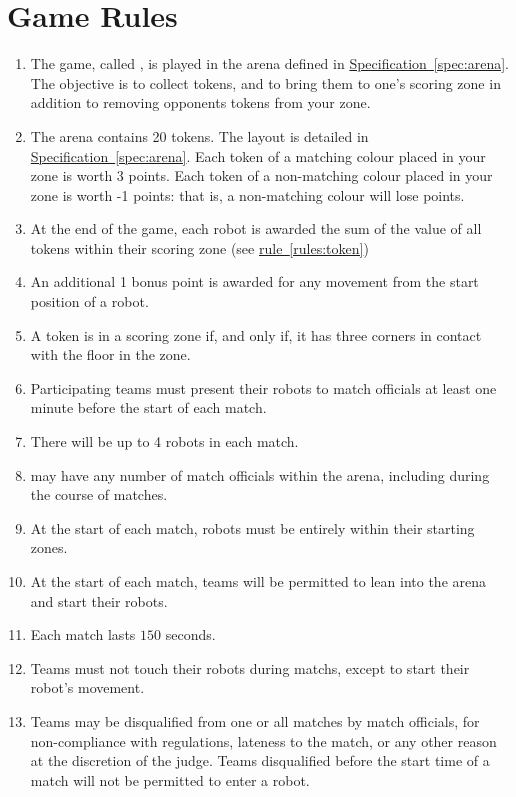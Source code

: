 \section{Game Rules}
\label{sec:rules}

\begin{enumerate}
  \item The game, called \emph{\gamename}, is played in the arena defined in
        \hyperref[spec:arena]{Specification~\ref*{spec:arena}}. The objective is
        to collect tokens, and to bring them to one's scoring zone in addition
        to removing opponents tokens from your zone.
  \item The arena contains 20 tokens. The layout is detailed in
        \hyperref[spec:arena]{Specification~\ref*{spec:arena}}. Each token of a
        matching colour placed in your zone is worth 3 points. Each token of a
        non-matching colour placed in your zone is worth -1 points: that is, a
        non-matching colour will lose points.
  \item At the end of the game, each robot is awarded the sum of the value of
        all tokens within their scoring zone (see
        \hyperref[rules:token]{rule~\ref*{rules:token}})
  \item An additional 1 bonus point is awarded for any movement from the
        start position of a robot.
  \item \label{rules:token}A token is in a scoring zone if, and only if, it
        has three corners in contact with the floor in the zone.
  \item Participating teams must present their robots to match officials at
        least one minute before the start of each match.
  \item There will be up to 4 robots in each match.
  \item \org may have any number of match officials within the arena, including
        during the course of matches.
  \item At the start of each match, robots must be entirely within their
        starting zones.
  \item At the start of each match, teams will be permitted to lean into the
        arena and start their robots.
  \item Each match lasts $150$ seconds.
  \item Teams must not touch their robots during matchs, except to start their
        robot's movement.
  \item Teams may be disqualified from one or all matches by match officials,
        for non-compliance with regulations, lateness to the match, or any other
        reason at the discretion of the judge. Teams disqualified before the
        start time of a match will not be permitted to enter a robot.
\end{enumerate}
